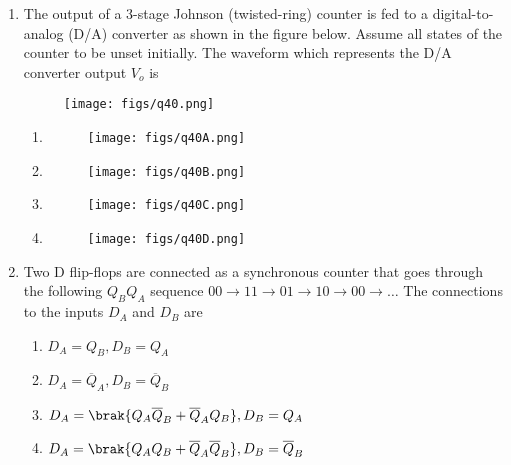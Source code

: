 \documentclass[a4paper, 11pt]{article}
\begin{document}
\begin{enumerate}
    \hfill{}

    \item The output of a 3-stage Johnson (twisted-ring) counter is fed to a digital-to-analog (D/A) converter as shown in the figure below. Assume all states of the counter to be unset initially. The waveform which represents the D/A converter output $V_{o}$ is
    
    \begin{figure}[H]
        \centering
        \texttt{[image: figs/q40.png]}
        \caption*{}
        \label{fig:q40}
    \end{figure}
    
    \begin{enumerate}
        \item \begin{figure}[H]\centering\texttt{[image: figs/q40A.png]}\caption*{}\label{fig:a40A}\end{figure}
        \item \begin{figure}[H]\centering\texttt{[image: figs/q40B.png]}\caption*{}\label{fig:a40B}\end{figure}
        \item \begin{figure}[H]\centering\texttt{[image: figs/q40C.png]}\caption*{}\label{fig:a40C}\end{figure}
        \item \begin{figure}[H]\centering\texttt{[image: figs/q40D.png]}\caption*{}\label{fig:a40D}\end{figure}
    \end{enumerate}

    \hfill{}

    \item Two D flip-flops are connected as a synchronous counter that goes through the following $Q_{B}Q_{A}$ sequence $00 \rightarrow 11 \rightarrow 01 \rightarrow 10 \rightarrow 00 \rightarrow \dots$
    The connections to the inputs $D_{A}$ and $D_{B}$ are
    
    \begin{enumerate}
        \item $D_{A}=Q_{B}, D_{B}=Q_{A}$
        \item $D_{A}=\overline{Q}_{A}, D_{B}=\overline{Q}_{B}$
        \item $D_{A}=\brak{Q_{A}\overline{Q}_{B}+\overline{Q}_{A}Q_{B}}, D_{B}=Q_{A}$
        \item $D_{A}=\brak{Q_{A}Q_{B}+\overline{Q}_{A}\overline{Q}_{B}}, D_{B}=\overline{Q}_{B}$
    \end{enumerate}


\end{enumerate}
\end{document}
